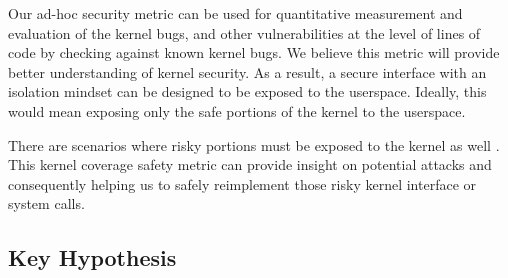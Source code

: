 


Our ad-hoc security metric can be used for quantitative measurement and evaluation of the kernel bugs,
and other vulnerabilities at the level of lines of code by checking against known kernel bugs.
We believe this metric will provide better understanding of kernel security.
As a result, a secure interface with an isolation mindset can be designed to be exposed to the userspace.
Ideally, this would mean exposing only the safe portions of the kernel to the userspace.

There are scenarios where risky portions must be exposed to the kernel as well .
This kernel coverage safety metric can provide insight on potential attacks and consequently helping us
to safely reimplement those risky kernel interface or system calls.



\subsection{Key Hypothesis}


